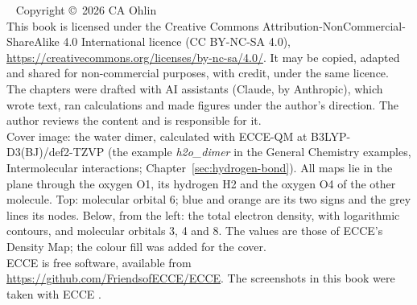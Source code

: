 \thispagestyle{empty}
~\vfill
\noindent Copyright \copyright\ 2026 CA Ohlin\\[6pt]
\noindent This book is licensed under the Creative Commons Attribution-NonCommercial-ShareAlike 4.0 International licence (CC BY-NC-SA 4.0), \url{https://creativecommons.org/licenses/by-nc-sa/4.0/}. It may be copied, adapted and shared for non-commercial purposes, with credit, under the same licence.\\[6pt]
\noindent The chapters were drafted with AI assistants (Claude, by Anthropic), which wrote text, ran calculations and made figures under the author's direction. The author reviews the content and is responsible for it.\\[6pt]
\noindent Cover image: the water dimer, calculated with ECCE-QM at B3LYP-D3(BJ)/def2-TZVP (the example \emph{h2o\_dimer} in the General Chemistry examples, Intermolecular interactions; Chapter~\ref{sec:hydrogen-bond}). All maps lie in the plane through the oxygen O1, its hydrogen H2 and the oxygen O4 of the other molecule. Top: molecular orbital 6; blue and orange are its two signs and the grey lines its nodes. Below, from the left: the total electron density, with logarithmic contours, and molecular orbitals 3, 4 and 8. The values are those of ECCE's Density Map; the colour fill was added for the cover.\\[6pt]
\noindent ECCE is free software, available from \url{https://github.com/FriendsofECCE/ECCE}. The screenshots in this book were taken with ECCE \ecceversion.
